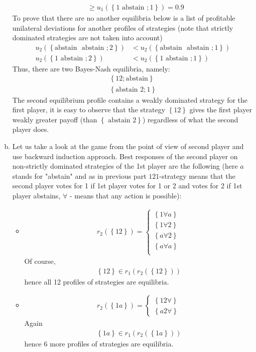 \documentclass[a4paper]{article}
\begin{document}
\begin{enumerate}[(a)]
\begin{align*}
	&\ge u_1(\left\{1\text{ abstain }; 1 \right\}) = 0.9
	\end{align*}
	 To prove that there are no another equilibria below is a list of profitable unilateral deviations for another profiles of strategies (note that strictly dominated strategies are not taken into account)
	\begin{align*}
	u_2(\left\{\text{abstain } \text{ abstain }; 2 \right\}) &< u_2(\left\{\text{abstain } \text{ abstain }; 1 \right\})\\
	u_2(\left\{1 \text{ abstain }; 2 \right\}) &< u_2(\left\{1 \text{ abstain }; 1 \right\})
	\end{align*}
	Thus, there are two Bayes-Nash equilibria, namely:
	\begin{align*}
	\left\{12; \text{abstain}\right\}\\
	\left\{\text{abstain } 2; 1 \right\}
	\end{align*}
	The second equilibrium profile contains a weakly dominated strategy for the first player, it is easy to observe that the strategy $\left\{12\right\}$ gives the first player weakly greater payoff (than $\left\{\text{ abstain } 2\right\}$) regardless of what the second player does.
	
	\item Let us take a look at the game from the point of view of second player and use backward induction approach. Best responses of the second player on non-strictly dominated strategies of the 1st player are the following (here $a$ stands for "abstain" and as in previous part $121$-strategy means that the second player votes for 1 if 1st player votes for 1 or 2 and votes for 2 if 1st player abstains, $\forall$ - means that any action is possible):
	\begin{itemize}
	\item \begin{align*}
	r_2(\left\{12\right\}) =\begin{cases} \left\{1\forall a \right\}\\
	\left\{1\forall 2 \right\}\\
	\left\{a\forall 2 \right\}\\
	\left\{a\forall a \right\}\\
	\end{cases}
	\end{align*}
	Of course, 
	\begin{align*}
	\left\{12\right\} \in r_1(r_2(\left\{12\right\}))
	\end{align*}
	hence all 12 profiles of strategies are equilibria. 
	\item \begin{align*}
	r_2(\left\{1a\right\}) = \begin{cases}
	\left\{12\forall \right\}\\
	\left\{a2\forall \right\}
	\end{cases}
	\end{align*}
	Again
	\begin{align*}
	\left\{1a\right\} \in r_1(r_2(\left\{1a\right\}))
	\end{align*}
	hence 6 more profiles of strategies are equilibria.
	

\end{itemize}
\end{enumerate}
\end{document}
